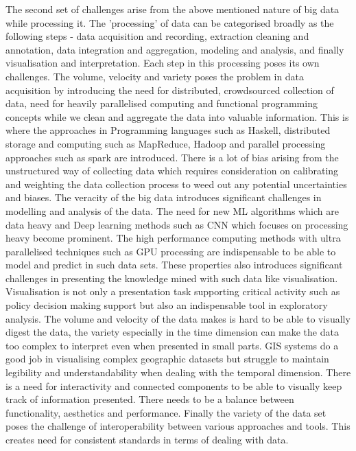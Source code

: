 The second set of challenges arise from the above mentioned nature of big data while processing it.
The 'processing' of data can be categorised broadly as the following steps - data acquisition and recording, extraction cleaning and annotation, data integration and aggregation, modeling and analysis, and finally visualisation and interpretation.
Each step in this processing poses its own challenges.
The volume, velocity and variety poses the problem in data acquisition by introducing the need for distributed, crowdsourced collection of data, need for heavily parallelised computing and functional programming concepts while we clean and aggregate the data into valuable information.
This is where the approaches in Programming languages such as Haskell, distributed storage and computing such as MapReduce, Hadoop and parallel processing approaches such as spark are introduced.
There is a lot of bias arising from the unstructured way of collecting data which requires consideration on calibrating and weighting the data collection process to weed out any potential uncertainties and biases.
The veracity of the big data introduces significant challenges in modelling and analysis of the data.
The need for new ML algorithms which are data heavy and Deep learning methods such as CNN which focuses on processing heavy become prominent.
The high performance computing methods with ultra parallelised techniques such as GPU processing are indispensable to be able to model and predict in such data sets.
These properties also introduces significant challenges in presenting the knowledge mined with such data like visualisation.
Visualisation is not only a presentation task supporting critical activity such as policy decision making support but also an indispensable tool in exploratory analysis.
The volume and velocity of the data makes is hard to be able to visually digest the data, the variety especially in the time dimension can make the data too complex to interpret even when presented in small parts.
GIS systems do a good job in visualising complex geographic datasets but struggle to maintain legibility and understandability when dealing with the temporal dimension.
There is a need for interactivity and connected components to be able to visually keep track of information presented.
There needs to be a balance between functionality, aesthetics and performance.
Finally the variety of the data set poses the challenge of interoperability between various approaches and tools.
This creates need for consistent standards in terms of dealing with data.


